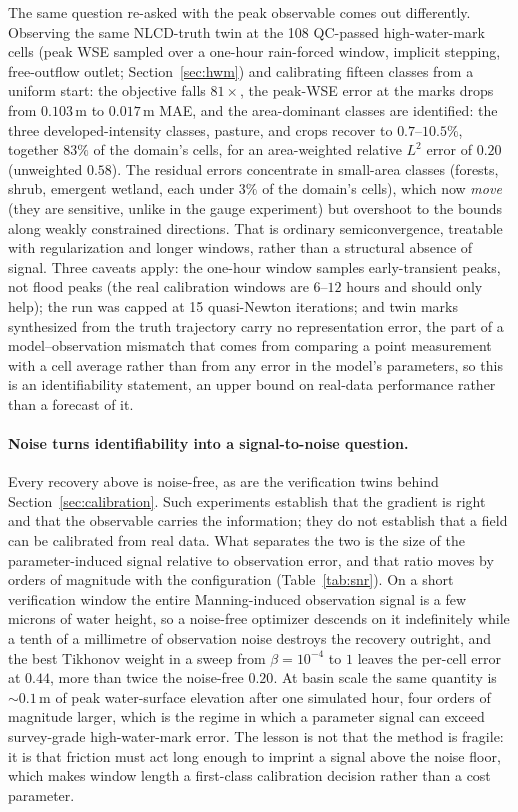 \documentclass[11pt]{article}
\begin{document}
The same question re-asked with the peak observable comes out
differently. Observing the same NLCD-truth twin at the 108
QC-passed high-water-mark cells (peak WSE sampled over a one-hour
rain-forced window, implicit stepping, free-outflow outlet;
Section~\ref{sec:hwm}) and calibrating fifteen classes from a uniform
start: the objective falls $81\times$, the peak-WSE error at the marks
drops from $0.103$\,m to $0.017$\,m MAE, and the area-dominant classes
are identified: the three developed-intensity classes, pasture, and
crops recover to $0.7$--$10.5\%$, together $83\%$ of the domain's
cells, for an area-weighted relative $L^2$ error of $0.20$ (unweighted
$0.58$). The residual errors concentrate in small-area classes
(forests, shrub, emergent wetland, each under $3\%$ of the domain's
cells), which now
\emph{move} (they are sensitive, unlike in the gauge experiment) but
overshoot to the bounds along weakly constrained directions. That is
ordinary semiconvergence, treatable with regularization and longer
windows, rather than a structural absence of signal. Three caveats
apply: the one-hour window samples early-transient peaks, not flood
peaks (the real calibration windows are $6$--$12$ hours and should
only help); the run was capped at 15 quasi-Newton iterations; and
twin marks synthesized from the truth trajectory carry no
representation error, the part of a model--observation mismatch that
comes from comparing a point measurement with a cell average rather
than from any error in the model's parameters, so this is an
identifiability statement, an upper bound on real-data performance
rather than a forecast of it.

\paragraph{Noise turns identifiability into a signal-to-noise question.}
Every recovery above is noise-free, as are the verification twins
behind Section~\ref{sec:calibration}. Such experiments establish that
the gradient is right and that the observable carries the information;
they do not establish that a field can be calibrated from real data.
What separates the two is the size of the parameter-induced signal
relative to observation error, and that ratio moves by orders of
magnitude with the configuration (Table~\ref{tab:snr}). On a short
verification window the entire Manning-induced observation signal is a
few microns of water height, so a noise-free optimizer descends on it
indefinitely while a tenth of a millimetre of observation noise
destroys the recovery outright, and the best Tikhonov weight in a
sweep from $\beta = 10^{-4}$ to $1$ leaves the per-cell error at
$0.44$, more than twice the noise-free $0.20$. At basin scale the
same quantity is
$\sim 0.1$\,m of peak water-surface elevation after one simulated
hour, four orders of magnitude larger, which is the regime in which a
parameter signal can exceed survey-grade high-water-mark error. The
lesson is not that the method is fragile: it is that friction must
act long enough to imprint a signal above the noise floor, which
makes window length a first-class calibration decision rather than a
cost parameter.
\end{document}

